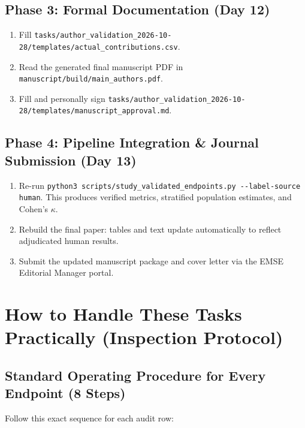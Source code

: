 \documentclass[11pt,a4paper]{article}
\begin{document}
\subsection{Phase 3: Formal Documentation (Day 12)}
\begin{enumerate}
  \item Fill \nolinkurl{tasks/author_validation_2026-10-28/templates/actual_contributions.csv}.
  \item Read the generated final manuscript PDF in \nolinkurl{manuscript/build/main_authors.pdf}.
  \item Fill and personally sign \nolinkurl{tasks/author_validation_2026-10-28/templates/manuscript_approval.md}.
\end{enumerate}

\subsection{Phase 4: Pipeline Integration \& Journal Submission (Day 13)}
\begin{enumerate}
  \item Re-run \nolinkurl{python3 scripts/study_validated_endpoints.py --label-source human}. This produces verified metrics, stratified population estimates, and Cohen's $\kappa$.
  \item Rebuild the final paper: tables and text update automatically to reflect adjudicated human results.
  \item Submit the updated manuscript package and cover letter via the EMSE Editorial Manager portal.
\end{enumerate}

\clearpage
\section{How to Handle These Tasks Practically (Inspection Protocol)}

\subsection{Standard Operating Procedure for Every Endpoint (8 Steps)}
Follow this exact sequence for each audit row:
\end{document}
